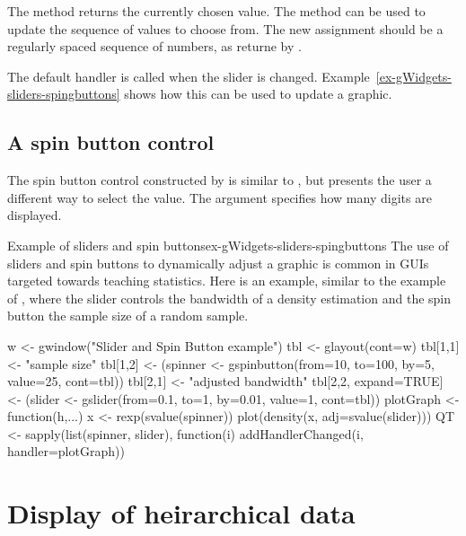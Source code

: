 The  method returns the currently chosen
value. The \method{[\ASSIGN}{gslider} method can be used to update the
sequence of values to choose from. The new assignment should be a
regularly spaced sequence of numbers, as returne by .

The default handler is called when the slider is changed. Example~\ref{ex-gWidgets-sliders-spingbuttons}
shows how this can be used to update a graphic.


\subsection{A spin button control}
\label{sec:gWidgets-spin-button-control}

The spin button control constructed by  is
similar to  , but presents the user a different
way to select the value. The argument 
specifies how many digits are displayed. 

\begin{example}{Example of sliders and spin buttons}{ex-gWidgets-sliders-spingbuttons}
  The use of sliders and spin buttons to dynamically adjust a graphic
  is common in \R\/ GUIs targeted towards teaching statistics. Here is
  an example, similar to the  example of ,
  where the slider controls the bandwidth of a density estimation and
  the spin button the sample size of a random sample.
\begin{Schunk}
\begin{Sinput}
 w <- gwindow("Slider and Spin Button example") 
 tbl <- glayout(cont=w)
 tbl[1,1] <- "sample size"
 tbl[1,2] <- (spinner <- gspinbutton(from=10, to=100, by=5, 
                                     value=25, cont=tbl))
 tbl[2,1] <- "adjusted bandwidth"
 tbl[2,2, expand=TRUE] <- (slider <- gslider(from=0.1, to=1, 
            by=0.01, value=1, cont=tbl))
 plotGraph <- function(h,...) {
   x <- rexp(svalue(spinner))
   plot(density(x, adj=svalue(slider)))
 }
 QT <- sapply(list(spinner, slider), function(i) 
   addHandlerChanged(i, handler=plotGraph))
\end{Sinput}
\end{Schunk}
\end{example}


\section{Display of heirarchical data}
\label{sec:gWidgets-displ-heir-data}

